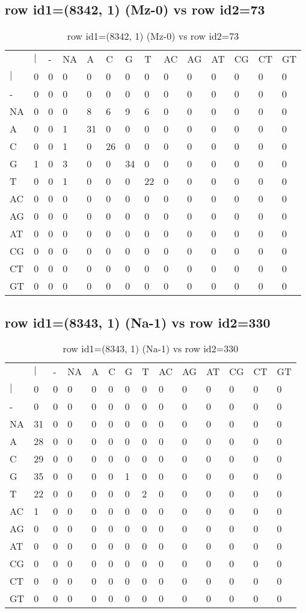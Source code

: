 \subsection{row id1=(8342, 1) (Mz-0) vs row id2=73}
\begin{center}
\begin{longtable}{|l|l|l|l|l|l|l|l|l|l|l|l|l|l|}
\caption{row id1=(8342, 1) (Mz-0) vs row id2=73} \label{table_dm356}\\
\hline
\\
\hline
&$|$&-&NA&A&C&G&T&AC&AG&AT&CG&CT&GT\\
$|$&0&0&0&0&0&0&0&0&0&0&0&0&0\\
-&0&0&0&0&0&0&0&0&0&0&0&0&0\\
NA&0&0&0&8&6&9&6&0&0&0&0&0&0\\
A&0&0&1&31&0&0&0&0&0&0&0&0&0\\
C&0&0&1&0&26&0&0&0&0&0&0&0&0\\
G&1&0&3&0&0&34&0&0&0&0&0&0&0\\
T&0&0&1&0&0&0&22&0&0&0&0&0&0\\
AC&0&0&0&0&0&0&0&0&0&0&0&0&0\\
AG&0&0&0&0&0&0&0&0&0&0&0&0&0\\
AT&0&0&0&0&0&0&0&0&0&0&0&0&0\\
CG&0&0&0&0&0&0&0&0&0&0&0&0&0\\
CT&0&0&0&0&0&0&0&0&0&0&0&0&0\\
GT&0&0&0&0&0&0&0&0&0&0&0&0&0\\
\hline
\end{longtable}
\end{center}

\subsection{row id1=(8343, 1) (Na-1) vs row id2=330}
\begin{center}
\begin{longtable}{|l|l|l|l|l|l|l|l|l|l|l|l|l|l|}
\caption{row id1=(8343, 1) (Na-1) vs row id2=330} \label{table_dm358}\\
\hline
\\
\hline
&$|$&-&NA&A&C&G&T&AC&AG&AT&CG&CT&GT\\
$|$&0&0&0&0&0&0&0&0&0&0&0&0&0\\
-&0&0&0&0&0&0&0&0&0&0&0&0&0\\
NA&31&0&0&0&0&0&0&0&0&0&0&0&0\\
A&28&0&0&0&0&0&0&0&0&0&0&0&0\\
C&29&0&0&0&0&0&0&0&0&0&0&0&0\\
G&35&0&0&0&0&1&0&0&0&0&0&0&0\\
T&22&0&0&0&0&0&2&0&0&0&0&0&0\\
AC&1&0&0&0&0&0&0&0&0&0&0&0&0\\
AG&0&0&0&0&0&0&0&0&0&0&0&0&0\\
AT&0&0&0&0&0&0&0&0&0&0&0&0&0\\
CG&0&0&0&0&0&0&0&0&0&0&0&0&0\\
CT&0&0&0&0&0&0&0&0&0&0&0&0&0\\
GT&0&0&0&0&0&0&0&0&0&0&0&0&0\\
\hline
\end{longtable}
\end{center}

